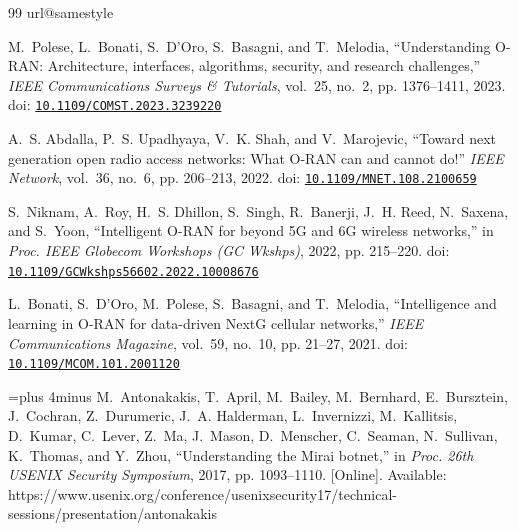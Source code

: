 \begin{thebibliography}{99}
\providecommand{\url}[1]{#1}
\csname url@samestyle\endcsname
\providecommand{\newblock}{\relax}
\providecommand{\bibinfo}[2]{#2}
\providecommand{\BIBentrySTDinterwordspacing}{\spaceskip=0pt\relax}
\providecommand{\BIBentryALTinterwordstretchfactor}{4}
\providecommand{\BIBentryALTinterwordspacing}{\spaceskip=\fontdimen2\font plus
\BIBentryALTinterwordstretchfactor\fontdimen3\font minus
  \fontdimen4\font\relax}
\providecommand{\BIBforeignlanguage}[2]{{%
\expandafter\ifx\csname l@#1\endcsname\relax
\typeout{** WARNING: IEEEtran.bst: No hyphenation pattern has been}%
\typeout{** loaded for the language `#1'. Using the pattern for}%
\typeout{** the default language instead.}%
\else
\language=\csname l@#1\endcsname
\fi
#2}}
\providecommand{\BIBdecl}{\relax}
\BIBdecl

M.~Polese, L.~Bonati, S.~D'Oro, S.~Basagni, and T.~Melodia, ``Understanding
  {O-RAN}: Architecture, interfaces, algorithms, security, and research
  challenges,'' \emph{IEEE Communications Surveys \& Tutorials}, vol.~25,
  no.~2, pp. 1376--1411, 2023. doi:
  \href{https://doi.org/10.1109/COMST.2023.3239220}{\nolinkurl{10.1109/COMST.2023.3239220}}

A.~S. Abdalla, P.~S. Upadhyaya, V.~K. Shah, and V.~Marojevic, ``Toward next
  generation open radio access networks: What {O-RAN} can and cannot do!''
  \emph{IEEE Network}, vol.~36, no.~6, pp. 206--213, 2022. doi:
  \href{https://doi.org/10.1109/MNET.108.2100659}{\nolinkurl{10.1109/MNET.108.2100659}}

S.~Niknam, A.~Roy, H.~S. Dhillon, S.~Singh, R.~Banerji, J.~H. Reed, N.~Saxena,
  and S.~Yoon, ``Intelligent {O-RAN} for beyond {5G} and {6G} wireless
  networks,'' in \emph{Proc. IEEE Globecom Workshops (GC Wkshps)}, 2022, pp.
  215--220. doi:
  \href{https://doi.org/10.1109/GCWkshps56602.2022.10008676}{\nolinkurl{10.1109/GCWkshps56602.2022.10008676}}

L.~Bonati, S.~D'Oro, M.~Polese, S.~Basagni, and T.~Melodia, ``Intelligence and
  learning in {O-RAN} for data-driven {NextG} cellular networks,'' \emph{IEEE
  Communications Magazine}, vol.~59, no.~10, pp. 21--27, 2021. doi:
  \href{https://doi.org/10.1109/MCOM.101.2001120}{\nolinkurl{10.1109/MCOM.101.2001120}}

\BIBentryALTinterwordspacing
M.~Antonakakis, T.~April, M.~Bailey, M.~Bernhard, E.~Bursztein, J.~Cochran,
  Z.~Durumeric, J.~A. Halderman, L.~Invernizzi, M.~Kallitsis, D.~Kumar,
  C.~Lever, Z.~Ma, J.~Mason, D.~Menscher, C.~Seaman, N.~Sullivan, K.~Thomas,
  and Y.~Zhou, ``Understanding the {Mirai} botnet,'' in \emph{Proc. 26th USENIX
  Security Symposium}, 2017, pp. 1093--1110. [Online]. Available:
  \url{https://www.usenix.org/conference/usenixsecurity17/technical-sessions/presentation/antonakakis}
\BIBentrySTDinterwordspacing


\end{thebibliography}
